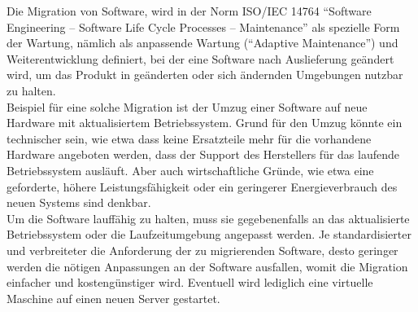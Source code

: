 Die Migration von Software, wird in der Norm ISO/IEC 14764 "`Software
Engineering -- Software Life Cycle Processes -- Maintenance"' als spezielle
Form der Wartung, nämlich als anpassende Wartung ("`Adaptive Maintenance"') und
Weiterentwicklung definiert, bei der eine Software nach Auslieferung geändert
wird, um das Produkt in geänderten oder sich ändernden Umgebungen nutzbar zu
halten.  \\
Beispiel für eine solche Migration ist der Umzug einer Software auf neue
Hardware mit aktualisiertem Betriebssystem. Grund für den Umzug könnte ein
technischer sein, wie etwa dass keine Ersatzteile mehr für die vorhandene
Hardware angeboten werden, dass der Support des Herstellers für das laufende
Betriebssystem ausläuft. Aber auch wirtschaftliche Gründe, wie etwa eine
geforderte, höhere Leistungsfähigkeit oder ein geringerer Energieverbrauch des
neuen Systems sind denkbar. \\
Um die Software lauffähig zu halten, muss sie gegebenenfalls an das
aktualisierte Betriebssystem oder die Laufzeitumgebung angepasst werden.
Je standardisierter und verbreiteter die Anforderung der zu migrierenden
Software, desto geringer werden die nötigen Anpassungen an der
Software ausfallen, womit die Migration einfacher und kostengünstiger wird.
Eventuell wird lediglich eine virtuelle Maschine auf einen neuen Server
gestartet. 

